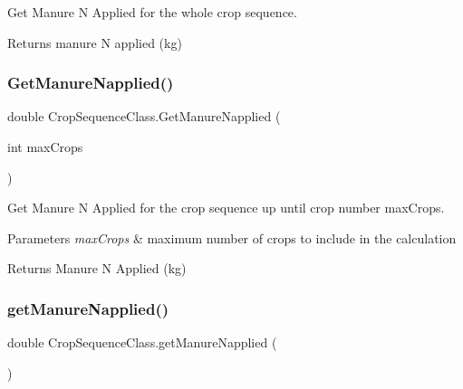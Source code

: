 Get Manure N Applied for the whole crop sequence. 

\begin{DoxyReturn}{Returns}
manure N applied (kg) 
\end{DoxyReturn}
\mbox{\label{class_crop_sequence_class_ab8a9ab2dcf60987421ec6d1dcc69be30}} 
\subsubsection{\texorpdfstring{GetManureNapplied()}{GetManureNapplied()}\hspace{0.1cm}{\footnotesize\ttfamily [2/2]}}
{\footnotesize\ttfamily double Crop\+Sequence\+Class.\+Get\+Manure\+Napplied (\begin{DoxyParamCaption}\item[{int}]{max\+Crops }\end{DoxyParamCaption})\hspace{0.3cm}{\ttfamily [inline]}}



Get Manure N Applied for the crop sequence up until crop number max\+Crops. 


\begin{DoxyParams}{Parameters}
{\em max\+Crops} & maximum number of crops to include in the calculation \\
\hline
\end{DoxyParams}
\begin{DoxyReturn}{Returns}
Manure N Applied (kg) 
\end{DoxyReturn}
\mbox{\label{class_crop_sequence_class_a065a47b85cc5dafc3ebdfea18b8981f9}} 
\subsubsection{\texorpdfstring{getManureNapplied()}{getManureNapplied()}\hspace{0.1cm}{\footnotesize\ttfamily [1/2]}}
{\footnotesize\ttfamily double Crop\+Sequence\+Class.\+get\+Manure\+Napplied (\begin{DoxyParamCaption}{ }\end{DoxyParamCaption})\hspace{0.3cm}{\ttfamily [inline]}}



